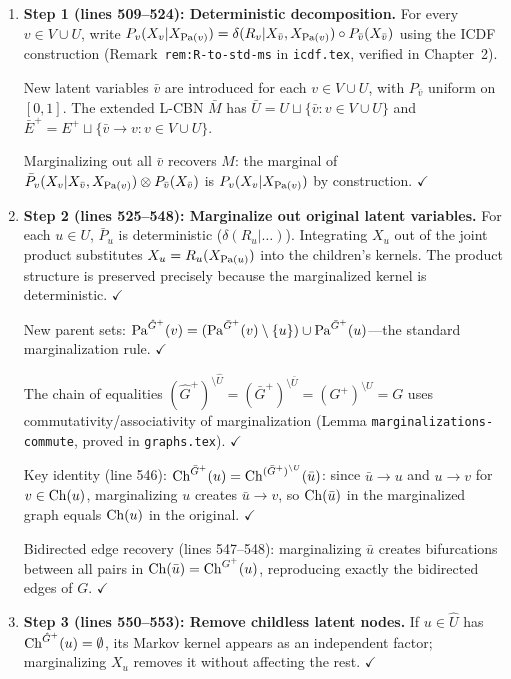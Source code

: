\documentclass{article}
\begin{document}
\begin{enumerate}[leftmargin=*]
  \item \textbf{Step 1 (lines 509--524): Deterministic decomposition.}
    For every $v\in V\cup U$, write $P_v(X_v|X_{\mathrm{Pa}(v)})
    = \delta(R_v|X_{\bar v},X_{\mathrm{Pa}(v)}) \circ P_{\bar v}(X_{\bar v})$
    using the ICDF construction (Remark~\texttt{rem:R-to-std-ms} in
    \texttt{icdf.tex}, verified in Chapter~2).

    New latent variables $\bar v$ are introduced for each $v\in V\cup U$, with
    $P_{\bar v}$ uniform on $[0,1]$.  The extended L-CBN $\bar M$ has
    $\bar U = U \sqcup \{\bar v : v\in V\cup U\}$ and
    $\bar E^+ = E^+ \sqcup \{\bar v\to v : v\in V\cup U\}$.

    Marginalizing out all $\bar v$ recovers $M$: the marginal of
    $\bar P_v(X_v|X_{\bar v},X_{\mathrm{Pa}(v)})\otimes P_{\bar v}(X_{\bar v})$
    is $P_v(X_v|X_{\mathrm{Pa}(v)})$ by construction.  $\checkmark$

  \item \textbf{Step 2 (lines 525--548): Marginalize out original latent variables.}
    For each $u\in U$, $\bar P_u$ is deterministic ($\delta(R_u|\ldots)$).
    Integrating $X_u$ out of the joint product substitutes $X_u=R_u(X_{\mathrm{Pa}(u)})$
    into the children's kernels.  The product structure is preserved precisely
    because the marginalized kernel is deterministic.  $\checkmark$

    New parent sets: $\mathrm{Pa}^{\hat G^+}(v) = (\mathrm{Pa}^{\bar G^+}(v)\setminus\{u\})
    \cup \mathrm{Pa}^{\bar G^+}(u)$---the standard marginalization rule.  $\checkmark$

    The chain of equalities
    $(\hat G^+)^{\setminus\hat U} = (\bar G^+)^{\setminus\bar U}
    = (G^+)^{\setminus U} = G$
    uses commutativity/associativity of marginalization (Lemma
    \texttt{marginalizations-commute}, proved in \texttt{graphs.tex}).  $\checkmark$

    Key identity (line 546):
    $\mathrm{Ch}^{\bar G^+}(u) = \mathrm{Ch}^{(\bar G^+)^{\setminus U}}(\bar u)$:
    since $\bar u\to u$ and $u\to v$ for $v\in\mathrm{Ch}(u)$,
    marginalizing $u$ creates $\bar u\to v$, so $\mathrm{Ch}(\bar u)$ in the
    marginalized graph equals $\mathrm{Ch}(u)$ in the original.  $\checkmark$

    Bidirected edge recovery (lines 547--548): marginalizing $\bar u$
    creates bifurcations between all pairs in $\mathrm{Ch}(\bar u) = \mathrm{Ch}^{G^+}(u)$,
    reproducing exactly the bidirected edges of $G$.  $\checkmark$

  \item \textbf{Step 3 (lines 550--553): Remove childless latent nodes.}
    If $u\in\hat U$ has $\mathrm{Ch}^{\hat G^+}(u)=\emptyset$, its Markov kernel
    appears as an independent factor; marginalizing $X_u$ removes it without
    affecting the rest.  $\checkmark$


\end{enumerate}
\end{document}
